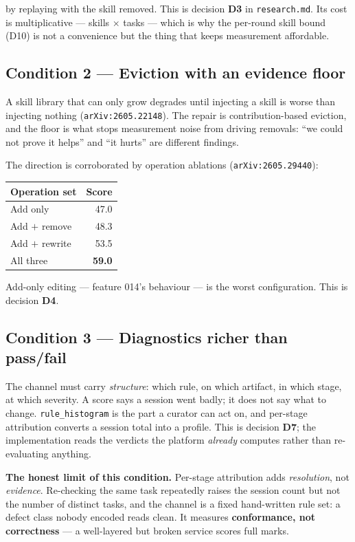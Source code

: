 \documentclass[11pt,a4paper]{article}
\begin{document}
by replaying with the skill removed. This is decision \textbf{D3} in
\texttt{research.md}. Its cost is multiplicative --- skills $\times$ tasks --- which
is why the per-round skill bound (D10) is not a convenience but the thing that
keeps measurement affordable.

\subsection{Condition 2 --- Eviction with an evidence floor}

A skill library that can only grow degrades until injecting a skill is worse than
injecting nothing (\texttt{arXiv:2605.22148}). The repair is contribution-based
eviction, and the floor is what stops measurement noise from driving removals:
``we could not prove it helps'' and ``it hurts'' are different findings.

The direction is corroborated by operation ablations
(\texttt{arXiv:2605.29440}):

\begin{center}
\begin{tabular}{@{}lr@{}}
\toprule
\textbf{Operation set} & \textbf{Score} \\
\midrule
Add only & 47.0 \\
Add $+$ remove & 48.3 \\
Add $+$ rewrite & 53.5 \\
All three & \textbf{59.0} \\
\bottomrule
\end{tabular}
\end{center}

Add-only editing --- feature 014's behaviour --- is the worst configuration. This is
decision \textbf{D4}.

\subsection{Condition 3 --- Diagnostics richer than pass/fail}

The channel must carry \emph{structure}: which rule, on which artifact, in which
stage, at which severity. A score says a session went badly; it does not say what
to change. \texttt{rule\_histogram} is the part a curator can act on, and
per-stage attribution converts a session total into a profile. This is decision
\textbf{D7}; the implementation reads the verdicts the platform \emph{already}
computes rather than re-evaluating anything.

\begin{notebox}[colframe=warn]
\textbf{The honest limit of this condition.} Per-stage attribution adds
\emph{resolution}, not \emph{evidence}. Re-checking the same task repeatedly raises
the session count but not the number of distinct tasks, and the channel is a fixed
hand-written rule set: a defect class nobody encoded reads clean. It measures
\textbf{conformance, not correctness} --- a well-layered but broken service scores
full marks.
\end{notebox}
\end{document}
